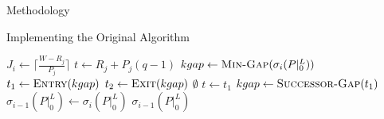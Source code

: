 \documentclass{article}
\begin{document}
\begin{section}{Methodology}
\begin{subsection}{Implementing the Original Algorithm}
    \begin{algorithm}[H]
      \caption{Gap-Tranformation Algorithm\autocite[12]{BelwalCheng}}\label{gapxfrm1}
      \begin{algorithmic}[2]
          \State $J_{i} \gets \lceil\frac{W - R_{j}}{P_{j}}\rceil$
            \State $t \gets R_{j} + P_{j}(q-1)$
            \State $kgap \gets \Call{Min-Gap}{\sigma_{i}(P|_{0}^{L})}$
            \State $t_{1} \gets \Call{Entry}{kgap}$
            \State $t_{2} \gets \Call{Exit}{kgap}$
                \State \Return $\emptyset$
              \EndIf
                \State $t \gets t_{1}$
              \EndIf
                \State \Call{Gap-Delete}{$\sigma_{i}(P|_{0}^{L}), [t_{1},t_{2})$}
                  \State \Call{Gap-Insert}{$\sigma_{i}(P|_{0}^{L}), [t_{1},t)$}
                  \ExitWhile
                \EndIf
                  \State \Call{Gap-Insert}{$\sigma_{i}(P|_{0}^{L}), [t_{1},t)$}
                  \State \Call{Gap-Insert}{$\sigma_{i}(P|_{0}^{L}), [t + C_{j},t_{2})$}
                  \ExitWhile
                \EndIf
                  \State \Call{Gap-Insert}{$\sigma_{i}(P|_{0}^{L}), [t_{1},t)$}
                \EndIf
              \EndIf
                \State $kgap \gets \Call{Successor-Gap}{t_{1}}$
              \EndIf
            \EndWhile
          \EndFor
          \State $\sigma_{i-1}(P|_{0}^{L}) \gets \sigma_{i}(P|_{0}^{L})$
          \State \Return $\sigma_{i-1}(P|_{0}^{L})$
        \EndFunction
      \end{algorithmic}
      \end{algorithm}
        
  \end{subsection}


\end{section}
\end{document}

